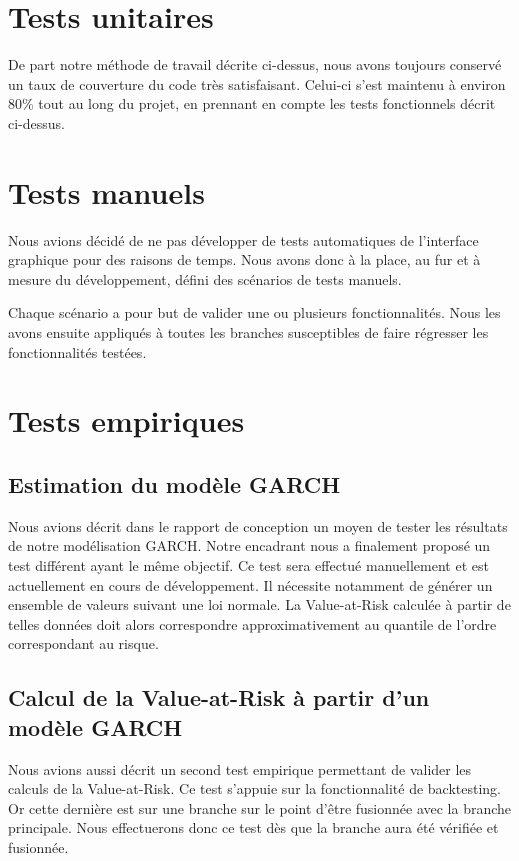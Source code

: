 \documentclass[a4paper,titlepage,french]{report}
\begin{document}
\section{Tests unitaires}

De part notre méthode de travail décrite ci-dessus, nous avons toujours conservé un taux de couverture du code très satisfaisant.
Celui-ci s'est maintenu à environ 80\% tout au long du projet, en prennant en compte les tests fonctionnels décrit ci-dessus.


\section{Tests manuels}

Nous avions décidé de ne pas développer de tests automatiques de l'interface graphique pour des raisons de temps.
Nous avons donc à la place, au fur et à mesure du développement, défini des scénarios de tests manuels.

Chaque scénario a pour but de valider une ou plusieurs fonctionnalités.
Nous les avons ensuite appliqués à toutes les branches susceptibles de faire régresser les fonctionnalités testées.


\section{Tests empiriques}

\subsection{Estimation du modèle GARCH}

Nous avions décrit dans le rapport de conception un moyen de tester les résultats de notre modélisation GARCH. Notre encadrant nous a finalement proposé un test différent ayant le même objectif.
Ce test sera effectué manuellement et est actuellement en cours de développement.
Il nécessite notamment de générer un ensemble de valeurs suivant une loi normale. La Value-at-Risk calculée à partir de telles données doit alors correspondre approximativement au quantile de l'ordre correspondant au risque.

\subsection{Calcul de la Value-at-Risk à partir d'un modèle GARCH}

Nous avions aussi décrit un second test empirique permettant de valider les calculs de la Value-at-Risk.
Ce test s'appuie sur la fonctionnalité de backtesting.
Or cette dernière est sur une branche sur le point d'être fusionnée avec la branche principale.
Nous effectuerons donc ce test dès que la branche aura été vérifiée et fusionnée.
\end{document}
